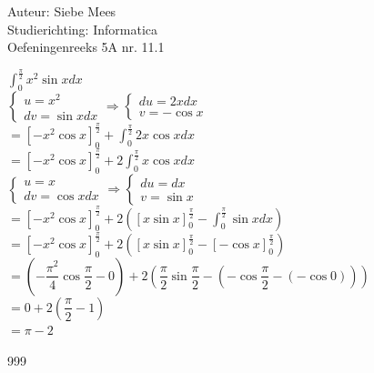 \documentclass[a4paper]{article}
\begin{document}
  
\noindent \large Auteur: Siebe Mees \\
\noindent \large Studierichting: Informatica\\
\noindent \large Oefeningenreeks 5A nr. 11.1\\

\medskip

\normalsize

$ \displaystyle\int_{0}^{\tfrac{\pi}{2}} x^2 \sin x dx $\\

$ \left \{
\begin{array}{l}
u = x^2 \\
dv = \sin x dx
\end{array}
\right .
\Rightarrow
\left \{
\begin{array}{l}
du = 2x dx \\
v = -\cos x
\end{array}
\right . $\\

$ = \left[ -x^2 \cos x \right]_{0}^{\tfrac{\pi}{2}} + \displaystyle\int_{0}^{\tfrac{\pi}{2}} 2x \cos x dx $\\

$ = \left[ -x^2 \cos x \right]_{0}^{\tfrac{\pi}{2}} + 2\displaystyle\int_{0}^{\tfrac{\pi}{2}} x \cos x dx $\\

$ \left \{
\begin{array}{l}
u = x \\
dv = \cos x dx
\end{array}
\right .
\Rightarrow
\left \{
\begin{array}{l}
du = dx \\
v = \sin x
\end{array}
\right . $\\

$ = \left[ -x^2 \cos x \right]_{0}^{\tfrac{\pi}{2}} + 2\left( \left[ x \sin x \right]_{0}^{\tfrac{\pi}{2}} - \displaystyle\int_{0}^{\tfrac{\pi}{2}} \sin x dx \right) $\\

$ = \left[ -x^2 \cos x \right]_{0}^{\tfrac{\pi}{2}} + 2\left( \left[ x \sin x \right]_{0}^{\tfrac{\pi}{2}} - \left[ -\cos x \right]_{0}^{\tfrac{\pi}{2}} \right) $\\

$ = \left( -\dfrac{\pi^2}{4}\cos \dfrac{\pi}{2} - 0 \right) + 2\left( \dfrac{\pi}{2}\sin \dfrac{\pi}{2} - ( -\cos \dfrac{\pi}{2} - ( -\cos 0 ) ) \right) $\\

$ = 0 + 2\left( \dfrac{\pi}{2} - 1 \right) $\\

$ = \pi - 2 $\\

\begin{thebibliography}{999}
\end{thebibliography}
\end{document}
